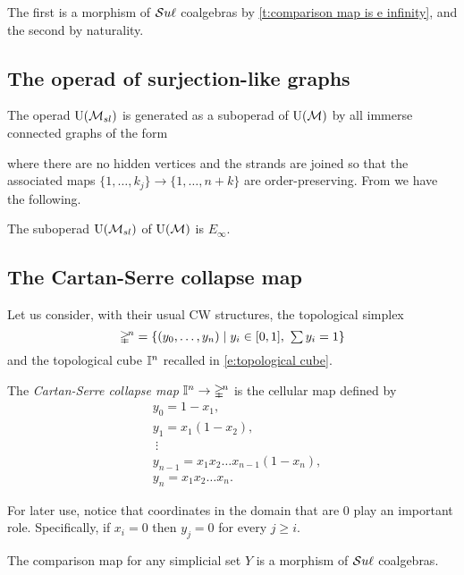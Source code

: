 The first is a morphism of $\mathcal{S}u\ell$ coalgebras by \cref{t:comparison map is e infinity}, and the second by naturality.

\subsection{The operad of surjection-like graphs} \label{ss:surjection-like graphs}

The operad ${\operatorname{U}(\mathcal{M}_{sl})}$ is generated as a suboperad of ${\operatorname{U}(\mathcal{M})}$ by all immerse connected graphs of the form

where there are no hidden vertices and the strands are joined so that the associated maps $\{1, \dots, k_j\} \to \{1, \dots, n+k\}$ are order-preserving.
From \cite{medina2021cubical} we have the following.

\begin{proposition} \label{p:simplicialandcubical}
	The suboperad ${\operatorname{U}(\mathcal{M}_{sl})}$ of ${\operatorname{U}(\mathcal{M})}$ is $E_\infty$.
\end{proposition}

\subsection{The Cartan-Serre collapse map} \label{ss:the cartan-serre collapse map}

Let us consider, with their usual CW structures, the topological simplex
\[
\mathbb{\Delta}^{\!n} = \{(y_0, \dots, y_n) \mid y_i \in [0,1], \ \textstyle{\sum} \, y_i = 1\}
\]
and the topological cube $\mathbb{I}^n$ recalled in \eqref{e:topological cube}.

The \textit{Cartan-Serre collapse map} $\mathbb{I}^n \to \mathbb{\Delta}^{\!n}$ is the cellular map defined by
\begin{equation} \label{e:cartan-serre CW map}
\begin{split}
&y_0 = 1 - x_1, \\
&y_1 = x_1(1 - x_2), \\
&\ \vdots \\
&y_{n-1} = x_1 x_2 \dots x_{n-1}(1-x_n), \\
&y_{n} = x_1 x_2 \dots x_n.
\end{split}
\end{equation}

For later use, notice that coordinates in the domain that are $0$ play an important role.
Specifically, if $x_i = 0$ then $y_{j} = 0$ for every $j \geq i$.


\begin{theorem} \label{t:comparison map is e infinity}
	The comparison map for any simplicial set $Y$ is a morphism of $\mathcal{S}u\ell$ coalgebras.
\end{theorem}

